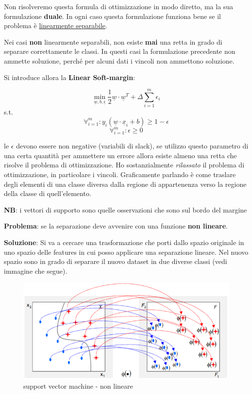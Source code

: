Non risolveremo questa formula di ottimizzazione in modo diretto, ma la sua formulazione \textbf{duale}. In ogni caso questa formulazione funziona bene se il problema \`e \underline{linearmente separabile}.

Nei casi \textbf{non} linearmente separabili, non esiste \textbf{mai} una retta in grado di separare correttamente le classi. In questi casi la formulazione precedente non ammette soluzione, perch\'e per alcuni dati i vincoli non ammettono soluzione. 

Si introduce allora la \textbf{Linear Soft-margin}:

\[ \min_{\underline{w},b,\underline{\epsilon}} \frac{1}{2}\underline{w} \cdot \underline{w}^T + \Delta \sum_{i=1}^{m} \epsilon_i \]
\qquad s.t.
\[\forall_{i=1}^m :  y_i (\underline{w} \cdot \underline{x}_i + b) \ge 1 - \epsilon \] \[\forall_{i=1}^m : \epsilon \ge 0\]

le $\epsilon$ devono essere non negative (variabili di slack), se utilizzo questo parametro di una certa quantit\`a per ammettere un errore allora esiste almeno una retta che risolve il problema di ottimizzazione. Ho sostanzialmente \textit{rilassato} il problema di ottimizzazione, in particolare i vincoli. Graficamente parlando \`e come traslare degli elementi di una classe diversa dalla regione di appartenenza verso la regione della classe di quell'elemento.

\textbf{NB}: i vettori di supporto sono quelle osservazioni che sono sul bordo del margine

\textbf{Problema}: se la separazione deve avvenire con una funzione \textbf{non lineare}.
 
\textbf{Soluzione}: Si va a cercare una trasformazione che porti dallo spazio originale in uno spazio delle features in cui posso applicare una separazione lineare. Nel nuovo spazio sono in grado di separare il nuovo dataset in due diverse classi (vedi immagine che segue). 

\begin{figure}[H]
	\hspace{-0.5cm}
	\includegraphics[height=0.45 \linewidth]{classification/pict/svm_nonlinear.png}
	\caption{support vector machine - non lineare}
\end{figure}

